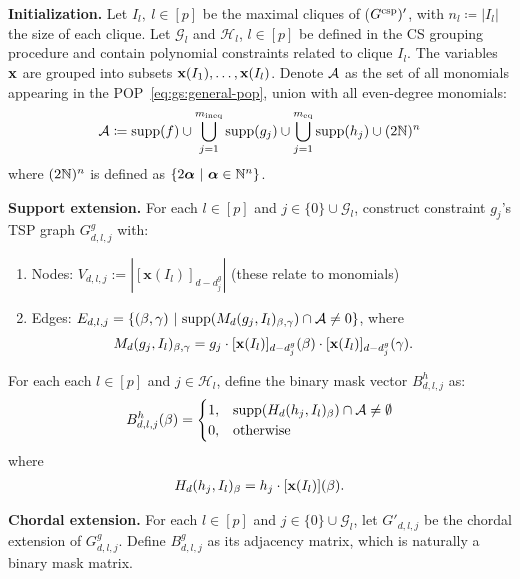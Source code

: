 \textbf{Initialization.} Let ${I_l}, \ l\in [p]$ be the maximal cliques of ($G^{\text{csp}})'$, with $n_l \coloneqq |I_l|$ the size of each clique. Let $\mathcal{G}_l$ and $\mathcal{H}_l$, $l\in [p]$ be defined in the CS grouping procedure and contain polynomial constraints related to clique $I_l$. The variables $\mathbf{x}$ are grouped into subsets $\mathbf{x}(I_1), \dots, \mathbf{x}(I_l)$. Denote ${\cal A}$ as the set of all monomials appearing in the POP~\eqref{eq:gs:general-pop}, union with all even-degree monomials:
\begin{align}
	\label{eq:gs:ts-A}
	{\cal A} \coloneqq \text{supp}(f)\cup\bigcup_{j = 1}^{m_{\text{ineq}}}\text{supp}(g_j)\cup\bigcup_{j = 1}^{m_{\text{eq}}}\text{supp}(h_j)\cup (2\mathbb{N})^n
\end{align}
where $(2\mathbb{N})^n$ is defined as $\left\{2\bm{\alpha} \ \middle\vert\  \bm{\alpha}\in \mathbb{N}^n\right\}$.

\textbf{Support extension.} For each $l \in [p]$ and $j \in \{0\} \cup \mathcal{G}_l$, construct constraint $g_j$'s TSP graph $G_{d,l,j}^g$ with:
\begin{enumerate}
    \item Nodes: $V_{d,l,j} := |[\mathbf{x}(I_l)]_{d-d_j^g}|$ (these relate to monomials)
    \item Edges: $E_{d,l,j} = \left\{(\beta, \gamma)\ \middle\vert\  \text{supp}( M_d(g_j, I_l)_{\beta,\gamma})\cap {\cal A} \ne 0\right\}$, where 
    \begin{align}
        \label{eq:gs:supp-beta-gamma}
       \hspace{-4mm} M_d(g_j, I_l)_{\beta,\gamma} = g_j \cdot [\mathbf{x}(I_l)]_{d-d_j^g}(\beta) \cdot [\mathbf{x}(I_l)]_{d-d_j^g}(\gamma).
    \end{align}
\end{enumerate}
For each each $l \in [p]$ and $j \in \mathcal{H}_l$, define the binary mask vector $B_{d,l,j}^h$ as:
\begin{align}
	\label{eq:gs:ts-equality-support-extension}
	B_{d,l,j}^h(\beta) = \begin{cases}
		1, & \text{supp}(H_d(h_j, I_l)_{\beta}) \cap {\cal A} \ne \emptyset\\
		0, & \text{otherwise}
	\end{cases}
\end{align}
where 
\begin{align}
    H_d(h_j, I_l)_{\beta} = h_j \cdot [\mathbf{x}(I_l)](\beta).
\end{align}

\textbf{Chordal extension.} For each $l \in [p]$ and $j \in \{0\} \cup \mathcal{G}_l$, let $G'_{d,l,j}$ be the chordal extension of $G_{d,l,j}^g$. Define $B_{d,l,j}^g$ as its adjacency matrix, which is naturally a binary mask matrix.

